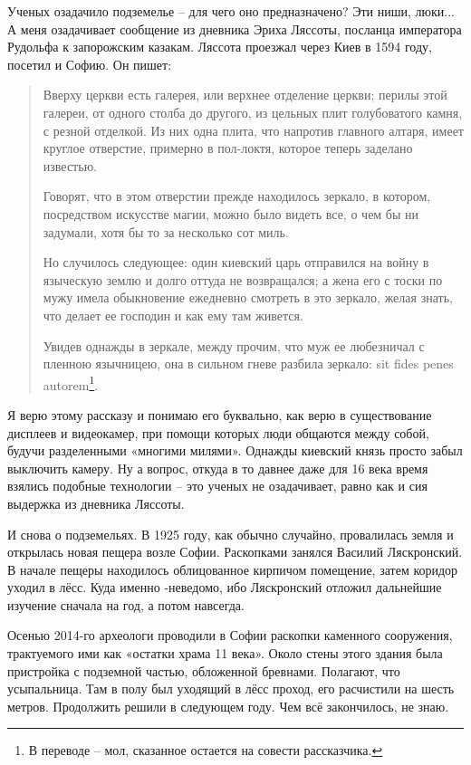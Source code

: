 Ученых озадачило подземелье – для чего оно предназначено? Эти ниши, люки... А меня озадачивает сообщение из дневника Эриха Ляссоты, посланца императора Рудольфа к запорожским казакам. Ляссота проезжал через Киев в 1594 году, посетил и Софию. Он пишет\cite{sbornikmat}:

\begin{quotation}
Вверху церкви есть галерея, или верхнее отделение церкви; перилы этой галереи, от одного столба до другого, из цельных плит голубоватого камня, с резной отделкой. Из них одна плита, что напротив главного алтаря, имеет круглое отверстие, примерно в пол-локтя, которое теперь заделано известью.

Говорят, что в этом отверстии прежде находилось зеркало, в котором, посредством искусстве магии, можно было видеть все, о чем бы ни задумали, хотя бы то за несколько сот миль.

Но случилось следующее: один киевский царь отправился на войну в языческую землю и долго оттуда не возвращался; а жена его с тоски по мужу имела обыкновение ежедневно смотреть в это зеркало, желая знать, что делает ее господин и как ему там живется.

Увидев однажды в зеркале, между прочим, что муж ее любезничал с пленною язычницею, она в сильном гневе разбила зеркало: sit fides penes autorem\footnote{В переводе – мол, сказанное остается на совести рассказчика.}.
\end{quotation}

Я верю этому рассказу и понимаю его буквально, как верю в существование дисплеев и видеокамер, при помощи которых люди общаются между собой, будучи разделенными «многими милями». Однажды киевский князь просто забыл выключить камеру. Ну а вопрос, откуда в то давнее даже для 16 века время взялись подобные технологии – это ученых не озадачивает, равно как и сия выдержка из дневника Ляссоты.

И снова о подземельях. В 1925 году, как обычно случайно, провалилась земля и открылась новая пещера возле Софии. Раскопками занялся Василий Ляскронский. В начале пещеры находилось облицованное кирпичом помещение, затем коридор уходил в лёсс. Куда именно -неведомо, ибо Ляскронский отложил дальнейшие изучение сначала на год, а потом навсегда.

Осенью 2014-го археологи проводили в Софии раскопки каменного сооружения, трактуемого ими как «остатки храма 11 века». Около стены этого здания была пристройка с подземной частью, обложенной бревнами. Полагают, что усыпальница. Там в полу был уходящий в лёсс проход, его расчистили на шесть метров. Продолжить решили в следующем году. Чем всё закончилось, не знаю. 

